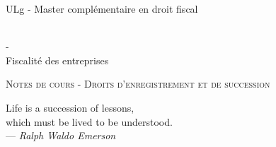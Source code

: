\documentclass{book}
\begin{document}
\sffamily
\newcommand{\RPoint}{\protect\texttt{[image: point.png]}}
\newcommand{\RSave}{\protect\texttt{[image: Save.png]}}
\renewcommand\labelitemii{\ding{220}}
\begin{titlepage}

\begin{center}
\begin{Large}ULg - Master complémentaire en droit fiscal\end{Large}\\
\vspace{0.5cm}- \\
\vspace{0.5cm}
Fiscalité des entreprises

\end{center}
\vspace{6cm}

\LARGE
\begin{center}
\textsc{Notes de cours - Droits d'enregistrement et de succession}\\
\end{center}

\vspace{10.0cm}

\normalsize
{}

\end{titlepage}

\newpage

\thispagestyle{empty}
\setcounter{page}{0}
\null

\newpage
\thispagestyle{empty}
\setcounter{page}{0}
\vspace{20cm}

\vfill
\begin{flushright}
Life is a succession of lessons, \\
which must be lived to be understood. \\ 
--- \textit{Ralph Waldo Emerson}
\end{flushright}
\vfill
\newpage

\renewcommand{\chaptermark}[1]{\markboth{#1}{}}
\renewcommand{\sectionmark}[1]{\markright{\thesection\ #1}}
\fancyhf{} \fancyhead[LE,RO]{\bfseries\thepage}
\fancyhead[LO]{\bfseries\rightmark}
\fancyhead[RE]{\bfseries\leftmark}
\renewcommand{\headrulewidth}{0.5pt}
\addtolength{\headheight}{0.5pt}
\renewcommand{\footrulewidth}{0pt}
\fancypagestyle{plain}{ \fancyhead{}
\renewcommand{\headrulewidth}{0pt}}
\end{document}
